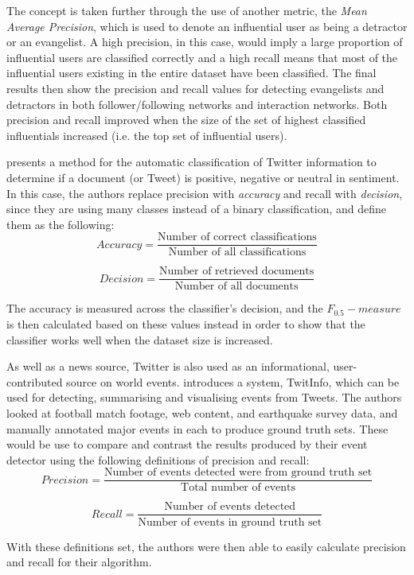 The concept is taken further through the use of another metric, the \emph{Mean Average Precision}, which is used to denote an influential user as being a detractor or an evangelist. A high precision, in this case, would imply a large proportion of influential users are classified correctly and a high recall means that most of the influential users existing in the entire dataset have been classified. The final results then show the precision and recall values for detecting evangelists and detractors in both follower/following networks and interaction networks. Both precision and recall improved when the size of the set of highest classified influentials increased (i.e. the top set of influential users).

\cite{pak10} presents a method for the automatic classification of Twitter information to determine if a document (or Tweet) is positive, negative or neutral in sentiment. In this case, the authors replace precision with \emph{accuracy} and recall with \emph{decision}, since they are using many classes instead of a binary classification, and define them as the following:
\[	
	Accuracy = \frac{\text{Number of correct classifications}}{\text{Number of all classifications}}
\]

\[
	Decision = \frac{\text{Number of retrieved documents}}{\text{Number of all documents}}
\]

The accuracy is measured across the classifier's decision, and the $ F_{0.5}-measure $  is then calculated based on these values instead in order to show that the classifier works well when the dataset size is increased.

As well as a news source, Twitter is also used as an informational, user-contributed source on world events. \cite{marcus11}  introduces a system, TwitInfo, which can be used for detecting, summarising and visualising events from Tweets. The authors looked at football match footage, web content, and earthquake survey data, and manually annotated major events in each to produce ground truth sets. These would be use to compare and contrast the results produced by their event detector using the following definitions of precision and recall:
\[	
	Precision = \frac{\text{Number of events detected were from ground truth set}}{\text{Total number of events}}
\]

\[
	Recall = \frac{\text{Number of events detected}}{\text{Number of events in ground truth set}}
\]

With these definitions set, the authors were then able to easily calculate precision and recall for their algorithm.

